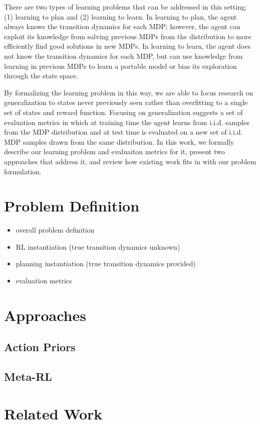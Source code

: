 There are two types of learning problems that can be addressed in this setting: (1) learning to plan and (2) learning to learn. In learning to plan, the agent always knows the transition dynamics for each MDP; however, the agent can exploit its knowledge from solving previous MDPs from the distribution to more efficiently find good solutions in new MDPs. In learning to learn, the agent does not know the transition dynamics for each MDP, but can use knowledge from learning in previous MDPs to learn a portable model or bias its exploration through the state space.

By formalizing the learning problem in this way, we are able to focus research on generalization to states never previously seen rather than overfitting to a single set of states and reward function. Focusing on generalization suggests a set of evaluation metrics in which at training time the agent learns from i.i.d. samples from the MDP distribution and at test time is evaluated on a new set of i.i.d. MDP samples drawn from the same distribution.  In this work, we formally describe our learning problem and evaluaiton metrics for it, present two approaches that address it, and review how existing work fits in with our problem formulation.


\section{Problem Definition}
\begin{itemize}
\item overall problem definition
\item RL instantiation (true transition dynamics unknown)
\item planning instantiation (true transition dynamics provided)
\item evaluation metrics 
\end{itemize}

\section{Approaches}
\subsection{Action Priors}
\subsection{Meta-RL}

\section{Related Work}
